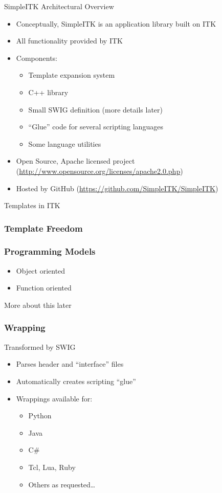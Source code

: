 \begin{frame}{SimpleITK Architectural Overview}
\begin{itemize}
\item Conceptually, SimpleITK is an application library built on ITK
\item All functionality provided by ITK
\item Components:
  \begin{itemize}
    \item Template expansion system
    \item C++ library
    \item Small SWIG definition (more details later)
    \item ``Glue'' code for several scripting languages
    \item Some language utilities
  \end{itemize}
\item Open Source, Apache licensed project (\url{http://www.opensource.org/licenses/apache2.0.php})
\item Hosted by GitHub (\url{https://github.com/SimpleITK/SimpleITK})
\end{itemize}
\end{frame}

\begin{frame}{Templates in ITK}
\begin{center}
\lstcpp

\end{center}
\end{frame}

\begin{frame}
\frametitle{Template Freedom}
\begin{center}
\lstcpp

\end{center}
\end{frame}

\begin{frame}
\frametitle{Programming Models}
\begin{itemize}
\item Object oriented
\item Function oriented
\end{itemize}
More about this later
\end{frame}

\begin{frame}
\frametitle{Wrapping}
Transformed by SWIG
\begin{itemize}
\item Parses header and ``interface'' files
\item Automatically creates scripting ``glue''
\item Wrappings available for:
\begin{itemize}
  \item Python
  \item Java
  \item C\#
  \item Tcl, Lua, Ruby
  \item Others as requested\dots
\end{itemize}
\end{itemize}
\end{frame}


